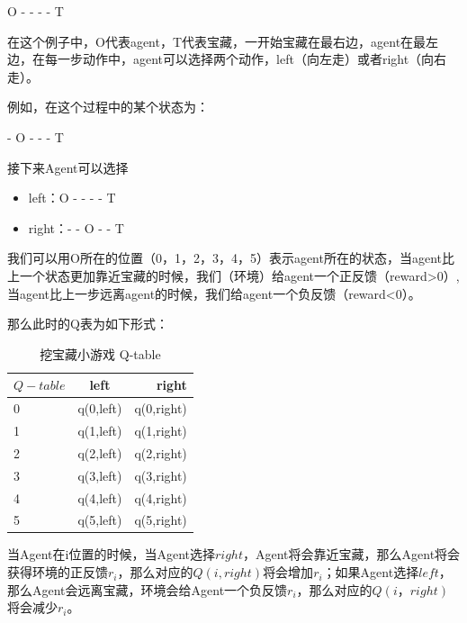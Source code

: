 \begin{exmp}[挖宝藏小游戏]
  
  O - - - - T

  在这个例子中，O代表agent，T代表宝藏，一开始宝藏在最右边，agent在最左边，在每一步动作中，agent可以选择两个动作，left（向左走）或者right（向右走）。

  例如，在这个过程中的某个状态为：

  - O - - - T

  接下来Agent可以选择
  \begin{itemize}
    \item left：O - - - - T
    \item right：- - O - - T
  \end{itemize}

  我们可以用O所在的位置（0，1，2，3，4，5）表示agent所在的状态，当agent比上一个状态更加靠近宝藏的时候，我们（环境）给agent一个正反馈（reward>0）,当agent比上一步远离agent的时候，我们给agent一个负反馈（reward<0）。

  那么此时的Q表为如下形式：
  \begin{table}
    \begin{center}
      \caption{挖宝藏小游戏 Q-table}
      \begin{tabular}{|l|c|r|}
        \hline
        $Q-table$ & left & right \\
        \hline
        0 & q(0,left) & q(0,right) \\
        \hline
        1 &q(1,left) &q(1,right) \\
        \hline
        2 &q(2,left)  &q(2,right) \\
        \hline
        3 &q(3,left) &q(3,right) \\
        \hline
        4 &q(4,left) &q(4,right) \\
        \hline
        5 &q(5,left) &q(5,right) \\
        \hline
      \end{tabular}
    \end{center}
  \end{table}

  当Agent在i位置的时候，当Agent选择$right$，Agent将会靠近宝藏，那么Agent将会获得环境的正反馈$r_i$，那么对应的$Q(i,right)$将会增加$r_i$；如果Agent选择$left$，那么Agent会远离宝藏，环境会给Agent一个负反馈$r_i$，那么对应的$Q(i，right)$将会减少$r_i$。

\end{exmp}

